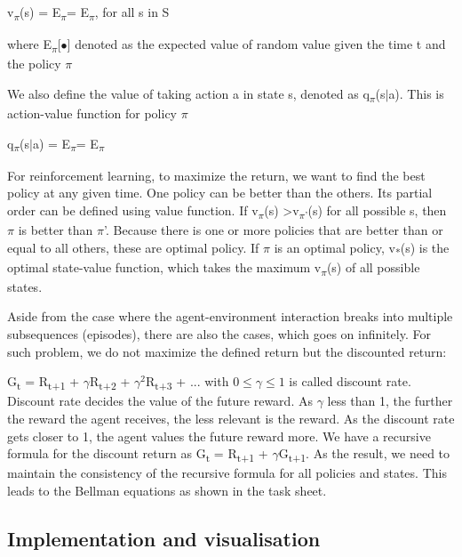 \documentclass[11pt]{article}
\begin{document}
v\textsubscript{$\pi$}(s) = E\textsubscript{$\pi$}\big[ G\textsubscript{$t$}|S\textsubscript{t}=s \big] = E\textsubscript{$\pi$}\big[ $\sum_{k=0}^{\infty} \gamma^{k} R\textsubscript{t+k+1} | S\textsubscript{t}=s$ \big], for all s in S

where E\textsubscript{$\pi$}[$\bullet$] denoted as the expected value of random value given the time t and the policy $\pi$

We also define the value of taking action a in state s, denoted as q\textsubscript{$\pi$}(s$\vert$a).
This is action-value function for policy $\pi$

q\textsubscript{$\pi$}(s$\vert$a) = E\textsubscript{$\pi$}\big[ G\textsubscript{$t$}|S\textsubscript{t}=s,  A\textsubscript{t}=a \big] = E\textsubscript{$\pi$}\big[ $\sum_{k=0}^{\infty} \gamma^{k} R\textsubscript{t+k+1} | S\textsubscript{t}=s, A\textsubscript{t}=a $ \big]

For reinforcement learning, to maximize the return, we want to find the best policy at any given time. One policy can be better than the others. Its partial order can be defined using value function. If v\textsubscript{$\pi$}(s) >v\textsubscript{$\pi$'}(s) for all possible s, then $\pi$ is better than $\pi$'. Because there is one or more policies that are better than or equal to all others, these are optimal policy. If $\pi$ is an optimal policy, v\textsubscript{*}(s) is the optimal state-value function, which takes the maximum v\textsubscript{$\pi$}(s) of all possible states.

Aside from the case where the agent-environment interaction breaks into multiple subsequences (episodes), there are also the cases, which goes on infinitely. For such problem, we do not maximize the defined return but the discounted return:

G\textsubscript{t} = R\textsubscript{t+1} + $\gamma$R\textsubscript{t+2} + $\gamma^{2}$R\textsubscript{t+3} + ... with $0 \leq \gamma \leq 1$ is called discount rate. Discount rate decides the value of the future reward. As $\gamma$ less than 1, the further the reward the agent receives, the less relevant is the reward. As the discount rate gets closer to 1, the agent values the future reward more. We have a recursive formula for the discount return as G\textsubscript{t} = R\textsubscript{t+1} + $\gamma$G\textsubscript{t+1}. As the result, we need to maintain the consistency of the recursive formula for all policies and states. This leads to the Bellman equations as shown in the task sheet.

\subsection{Implementation and visualisation}
\end{document}
